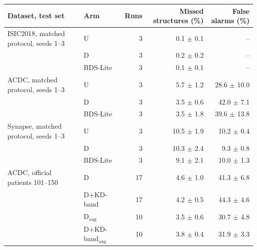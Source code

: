\begin{tabular}{@{}llrrr@{}}
\toprule
Dataset, test set & Arm & Runs & Missed structures (\%) & False alarms (\%) \\
\midrule
ISIC2018, matched protocol, seeds 1--3 & U & 3 & 0.1 $\pm$ 0.1 & -- \\
 & D & 3 & 0.2 $\pm$ 0.2 & -- \\
 & BDS-Lite & 3 & 0.1 $\pm$ 0.1 & -- \\
\addlinespace
ACDC, matched protocol, seeds 1--3 & U & 3 & 5.7 $\pm$ 1.2 & 28.6 $\pm$ 10.0 \\
 & D & 3 & 3.5 $\pm$ 0.6 & 42.0 $\pm$ 7.1 \\
 & BDS-Lite & 3 & 3.5 $\pm$ 1.8 & 39.6 $\pm$ 13.8 \\
\addlinespace
Synapse, matched protocol, seeds 1--3 & U & 3 & 10.5 $\pm$ 1.9 & 10.2 $\pm$ 0.4 \\
 & D & 3 & 10.3 $\pm$ 2.4 & 9.3 $\pm$ 0.8 \\
 & BDS-Lite & 3 & 9.1 $\pm$ 2.1 & 10.0 $\pm$ 1.3 \\
\addlinespace
ACDC, official patients 101--150 & D & 17 & 4.6 $\pm$ 1.0 & 41.3 $\pm$ 6.8 \\
 & D+KD-band & 17 & 4.2 $\pm$ 0.5 & 44.3 $\pm$ 4.6 \\
 & D$_{\mathrm{aug}}$ & 10 & 3.5 $\pm$ 0.6 & 30.7 $\pm$ 4.8 \\
 & D+KD-band$_{\mathrm{aug}}$ & 10 & 3.8 $\pm$ 0.4 & 31.9 $\pm$ 3.3 \\
\bottomrule
\end{tabular}
